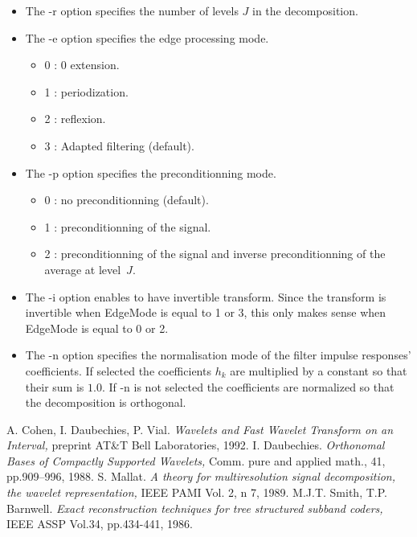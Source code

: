 \begin{itemize}
\item
The -r option specifies the number of levels $J$ in the decomposition.
\item
The -e option specifies the edge processing mode.
\begin{itemize}
\item
0 : 0 extension.
\item
1 : periodization.
\item
2 : reflexion.
\item
3 : Adapted filtering (default).
\end{itemize}
\item
The -p option specifies the preconditionning mode.
\begin{itemize}
\item
0 : no preconditionning (default).
\item
1 : preconditionning of the signal.
\item
2 : preconditionning of the signal and inverse preconditionning of the average at level~$J$.
\end{itemize}
\item
The -i option enables to have invertible transform. Since the transform is invertible when EdgeMode is equal to 1 or 3, this only makes sense when EdgeMode is equal to 0 or 2. 
\item
The -n option specifies the normalisation mode of the filter impulse responses' coefficients. If selected the coefficients $h_{k}$ are multiplied by a constant so that their sum is $1.0$. If -n is not selected the coefficients are normalized so that the decomposition is orthogonal. 
\end{itemize}

\begin{thebibliography}{Dau1}

 A. Cohen, I. Daubechies, P. Vial. 
{\em Wavelets and Fast Wavelet Transform on an Interval, } 
preprint AT\&T Bell Laboratories, 1992.
 I. Daubechies. 
{\em Orthonomal Bases of Compactly Supported Wavelets, } 
Comm. pure and applied math., 41, pp.909--996, 1988.
 S. Mallat. {\em A theory for multiresolution signal decomposition, the wavelet representation, } IEEE PAMI Vol. 2, n 7, 1989.
 M.J.T. Smith, T.P. Barnwell. {\em Exact reconstruction techniques for tree structured subband coders, } IEEE ASSP Vol.34, pp.434-441, 1986.

\end{thebibliography}



\parindent 0.0cm 
\parskip 0.0cm
